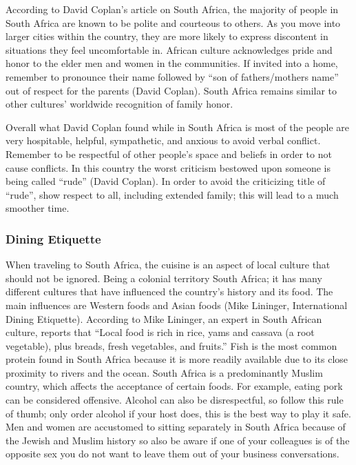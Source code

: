 \documentclass[11pt,a4paper,oneside]{report}
\begin{document}
According to David Coplan’s article on South Africa, the majority of people in
South Africa are known to be polite and courteous to others. As you move into
larger cities within the country, they are more likely to express discontent in
situations they feel uncomfortable in. African culture acknowledges pride and
honor to the elder men and women in the communities. If invited into a home,
remember to pronounce their name followed by “son of fathers/mothers name” out
of respect for the parents (David Coplan). South Africa remains similar to
other cultures’ worldwide recognition of family honor.


Overall what David Coplan found while in South Africa is most of the people are
very hospitable, helpful, sympathetic, and anxious to avoid verbal conflict.
Remember to be respectful of other people’s space and beliefs in order to not
cause conflicts. In this country the worst criticism bestowed upon someone is
being called “rude” (David Coplan).  In order to avoid the criticizing title of
“rude”, show respect to all, including extended family; this will lead to a
much smoother time.

\subsubsection{Dining Etiquette}\label{third}

When traveling to South Africa, the cuisine is an aspect of local culture that
should not be ignored. Being a colonial territory South Africa; it has many
different cultures that have influenced the country’s history and its food. The
main influences are Western foods and Asian foods (Mike Lininger, International
Dining Etiquette).  According to Mike Lininger, an expert in South African
culture, reports that “Local food is rich in rice, yams and cassava (a root
vegetable), plus breads, fresh vegetables, and fruits.” Fish is the most common
protein found in South Africa because it is more readily available due to its
close proximity to rivers and the ocean. South Africa is a predominantly Muslim
country, which affects the acceptance of certain foods. For example, eating
pork can be considered offensive.  Alcohol can also be disrespectful, so follow
this rule of thumb; only order alcohol if your host does, this is the best way
to play it safe. Men and women are accustomed to sitting separately in South
Africa because of the Jewish and Muslim history so also be aware if one of your
colleagues is of the opposite sex you do not want to leave them out of your
business conversations.
\end{document}
